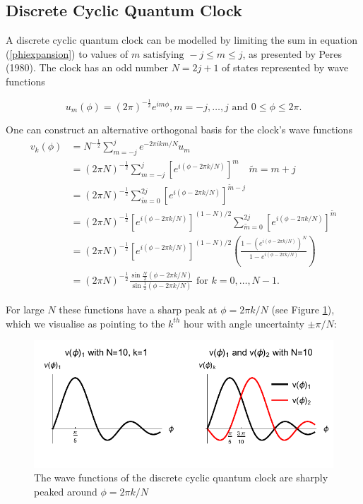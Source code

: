 \documentclass{article}
\begin{document}
\subsection{Discrete Cyclic Quantum Clock}
\label{subsection:dcqc}
A discrete cyclic quantum clock can be modelled by limiting the sum in equation (\ref{phiexpansion}) to values of \linebreak $m \text{ satisfying } -j \leq m \leq j$, as presented by Peres (1980). The clock has an odd number $N = 2j+1$ of states represented by wave functions

\begin{equation}
	u_m(\phi) = (2\pi)^{-\frac{1}{2}}e^{im\phi}, m = -j,\dots, j \text{ and } 0 \leq \phi \leq 2\pi.
\end{equation}

\noindent One can construct an alternative orthogonal basis for the clock's wave functions
\begin{subequations}
\begin{align}
	v_k(\phi) &= N^{-\frac{1}{2}}\sum_{m=-j}^j e^{-2\pi ikm/N}u_m \label{vkexpansion}\\
		    &= (2\pi N)^{-\frac{1}{2}}\sum_{m=-j}^j [e^{i(\phi-2\pi k/N)}]^m \quad \tilde{m} = m+j \\
		    &= (2\pi N)^{-\frac{1}{2}}\sum_{\tilde{m}=0}^{2j} [e^{i(\phi-2\pi k/N)}]^{\tilde{m}-j} \\
		    &= (2\pi N)^{-\frac{1}{2}}[e^{i(\phi-2\pi k/N)}]^{(1-N)/2}\sum_{\tilde{m}=0}^{2j}[e^{i(\phi-2\pi k/N)}]^{\tilde{m}} \\
		    &= (2\pi N)^{-\frac{1}{2}}[e^{i(\phi-2\pi k/N)}]^{(1-N)/2}\left(\frac{1-(e^{i(\phi-2\pi k/N)})^N}{1-e^{i(\phi-2\pi k/N)}}\right) \\
		    &= (2\pi N)^{-\frac{1}{2}}\frac{\sin{\frac{N}{2}(\phi-2\pi k/N)}}{\sin{\frac{1}{2}(\phi-2\pi k/N)}} \text{ for } k = 0,\dots,N-1.
\end{align}
\end{subequations}

\noindent For large $N$ these functions have a sharp peak at $\phi = 2\pi k/N$ (see Figure \ref{fig:wavepeak}), which we visualise as pointing to the $k^{th}$ hour with angle uncertainty $\pm \pi/N$:

\begin{figure}[ht]
\centering
\includegraphics{plot1.pdf}
\caption{The wave functions of the discrete cyclic quantum clock are sharply peaked around $\phi = 2\pi k/N$}
\label{fig:wavepeak}
\end{figure}
\end{document}
